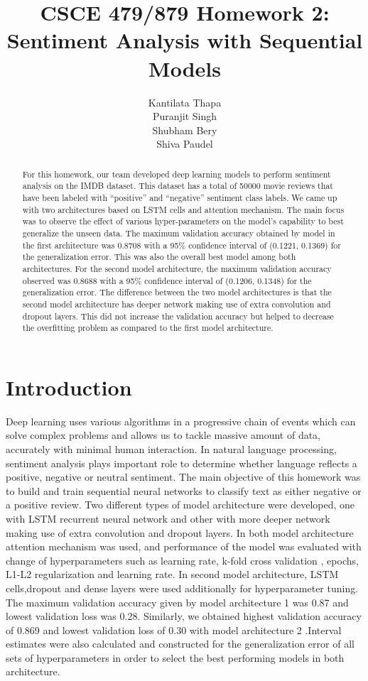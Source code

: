 \documentclass{article}
\title{CSCE 479/879 Homework 2:
Sentiment Analysis with Sequential Models}
\author{Kantilata Thapa\\
Puranjit Singh\\
Shubham Bery\\
Shiva Paudel}
\begin{document}
\maketitle

\begin{abstract}
    For this homework, our team developed deep learning models to perform sentiment analysis on the IMDB dataset. This dataset has a total of 50000 movie reviews that have been labeled with “positive” and “negative” sentiment class labels. We came up with two architectures based on LSTM cells and attention mechanism. The main focus was to observe the effect of various
hyper-parameters on the model's capability to best generalize the unseen data.
The maximum validation accuracy obtained by model in the first architecture was 0.8708 with a 95\% confidence interval of (0.1221, 0.1369)
for the generalization error. This was also the overall best model among
both architectures. For the second model architecture, the maximum validation accuracy observed was 0.8688 with a 95\% confidence interval of
(0.1206, 0.1348) for the generalization error. The difference between the
two model architectures is that the second model architecture has deeper network making use of extra convolution and dropout layers.
This did not increase the validation accuracy but helped to decrease the overfitting problem as
compared to the first model architecture.

\end{abstract}

\section{Introduction}
\label{sec:intro}

Deep learning uses various algorithms in a progressive chain of events which can solve complex problems and allows us to tackle massive amount of data, accurately with minimal human interaction. In natural language processing, sentiment analysis plays important role to determine whether language reflects a positive, negative or neutral sentiment. The main objective of this homework was to build and train sequential neural networks to classify text as either negative or a positive review. Two different types of model architecture were developed, one with LSTM recurrent neural network and other with more deeper network making use of extra convolution and dropout layers. In both model architecture attention mechanism was used, and performance of the model was evaluated with change of hyperparameters such as learning rate, k-fold cross validation , epochs, L1-L2 regularization and learning rate. In second model architecture, LSTM cells,dropout and dense layers were used additionally for hyperparameter tuning. The maximum validation accuracy given by model architecture 1 was 0.87 and lowest validation loss was 0.28. Similarly, we obtained highest validation accuracy of 0.869 and lowest validation loss of 0.30 with model architecture 2 .Interval estimates were also calculated and constructed for the generalization error of all sets of hyperparameters in order to select the best performing models in both architecture. 
\end{document}
